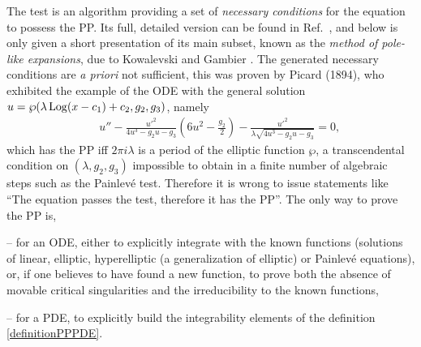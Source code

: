 \documentclass[10pt]{article}
\begin{document}
The test is an algorithm providing a set of \textit{necessary conditions}
for the equation to possess the PP.
Its full, detailed version can be found in
Ref.~\cite[\S 6]{Cargese1996Conte},
and below is only given a short presentation of its main subset,
known as the 
\textit{method of pole-like expansions},
due to Kowalevski and Gambier \cite{GambierThese}.
The generated necessary conditions are \textit{a priori} not sufficient,
this was proven by Picard (1894), who exhibited the example
of the ODE with the general solution $u=\wp(\lambda \mathop{\rm Log}\nolimits(x-c_1)+c_2,g_2,g_3)$,
namely
\begin{eqnarray}
& &
u'' - \frac{{u'}^2}{4 u^3 - g_2 u - g_3}\left(6 u^2 - \frac{g_2}{2}\right)
- \frac{{u'}^2}{\lambda \sqrt{4 u^3 - g_2 u - g_3}}=0,
\label{eqPicardEllipticExample}
\end{eqnarray}
which has the PP iff $2 \pi i \lambda$ is a period of the elliptic function
$\wp$,
a transcendental condition on $(\lambda,g_2,g_3)$ impossible to obtain
in a finite number of algebraic steps such as the Painlev\'e test.
Therefore it is wrong to issue statements like
``The equation passes the test, therefore it has the PP''.
The only way to prove the PP is,
\begin{description}
\item{--}
for an ODE,
either to explicitly integrate with the known functions
(solutions of linear, elliptic, hyperelliptic (a generalization of elliptic) 
or Painlev\'e equations),
or,
if one believes to have found a new function,
to prove both the absence of movable critical singularities and the
irreducibility \cite{U1990} to the known functions,

\item{--}
for a PDE,
to explicitly build the integrability elements of the definition
\ref{definitionPPPDE}.

\end{description}
\end{document}
